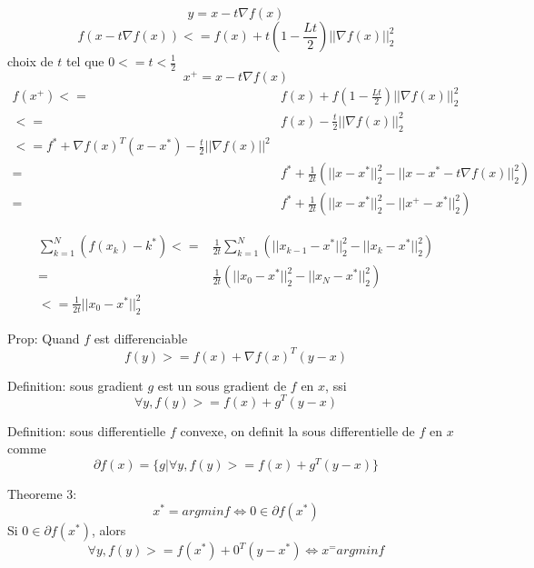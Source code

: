 \documentclass{article}
\begin{document}
\begin{equation}
y=x-t\nabla f(x)
\end{equation}
\begin{equation}
f(x-t\nabla f(x))<=f(x)+t(1-\frac{Lt}{2})||\nabla f(x)||_2^2
\end{equation}
choix de $t$ tel que $0<=t<\frac{1}{2}$
\begin{equation}
x^+=x-t\nabla f(x)
\end{equation}
\begin{equation}
\begin{split}
f(x^+)<=&f(x)+f(1-\frac{Lt}{2})||\nabla f(x)||_2^2\\
<=& f(x)-\frac{t}{2}||\nabla f(x)||_2^2\\
<=f^*+\nabla f(x)^T (x-x^*)-\frac{t}{2}||\nabla f(x)||^2\\
=& f^*+\frac{1}{2t}(||x-x^*||_2^2-||x-x^*-t\nabla f(x)||_2^2)\\
=& f^* +\frac{1}{2t}(||x-x^*||^2_2-||x^+-x^*||_2^2)
\end{split}
\end{equation}

\begin{equation}
\begin{split}
\sum_{k=1}^N (f(x_k)-k^*)<=&\frac{1}{2t}\sum_{k=1}^N(||x_{k-1}-x^*||_2^2-||x_k-x^*||_2^2)\\
=&\frac{1}{2t}(||x_0-x^*||_2^2-||x_N-x^*||_2^2)\\
<=\frac{1}{2t}||x_0-x^*||_2^2
\end{split}
\end{equation}


Prop: Quand $f$ est differenciable
\begin{equation}
f(y)>=f(x)+\nabla f(x)^T(y-x)
\end{equation}

Definition: sous gradient
$g$ est un sous gradient de $f$ en $x$, ssi
\begin{equation}
\forall y, f(y)>=f(x)+g^T(y-x)
\end{equation}

Definition: sous differentielle
$f$ convexe, on definit la sous differentielle de $f$ en $x$ comme
\begin{equation}
\partial f(x)=\{g|\forall y, f(y)>=f(x)+g^T(y-x)\}
\end{equation}

Theoreme 3:
\begin{equation}
x^*=argmin f \Leftrightarrow 0 \in \partial f(x^*)
\end{equation}
Si $0 \in \partial f(x^*)$, alors
\begin{equation}
\forall y, f(y)>=f(x^*)+0^T(y-x^*) \Leftrightarrow x^=argmin f
\end{equation}
\end{document}
